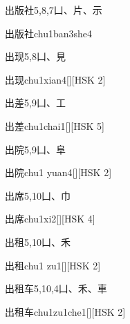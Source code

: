 \begin{entry}{出版社}{5,8,7}{⼐、⽚、⽰}
  \begin{phonetics}{出版社}{chu1ban3she4}
  \end{phonetics}
\end{entry}

\begin{entry}{出现}{5,8}{⼐、⾒}
  \begin{phonetics}{出现}{chu1xian4}[][HSK 2]
  \end{phonetics}
\end{entry}

\begin{entry}{出差}{5,9}{⼐、⼯}
  \begin{phonetics}{出差}{chu1chai1}[][HSK 5]
  \end{phonetics}
\end{entry}

\begin{entry}{出院}{5,9}{⼐、⾩}
  \begin{phonetics}{出院}{chu1 yuan4}[][HSK 2]
  \end{phonetics}
\end{entry}

\begin{entry}{出席}{5,10}{⼐、⼱}
  \begin{phonetics}{出席}{chu1xi2}[][HSK 4]
  \end{phonetics}
\end{entry}

\begin{entry}{出租}{5,10}{⼐、⽲}
  \begin{phonetics}{出租}{chu1 zu1}[][HSK 2]
  \end{phonetics}
\end{entry}

\begin{entry}{出租车}{5,10,4}{⼐、⽲、⾞}
  \begin{phonetics}{出租车}{chu1zu1che1}[][HSK 2]
  \end{phonetics}
\end{entry}

